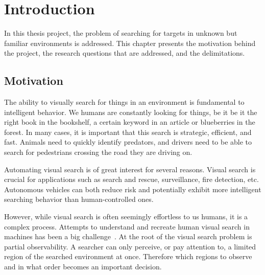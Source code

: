 
\chapter{Introduction}
\label{cha:introduction}


In this thesis project, the problem of searching for targets in unknown but familiar environments is addressed.
This chapter presents the motivation behind the project, the research questions that are addressed, and the delimitations. 

\section{Motivation}
\label{sec:motivation}


The ability to visually search for things in an environment is fundamental to intelligent behavior.
We humans are constantly looking for things, be it be it the right book in the bookshelf, a certain keyword in an article or blueberries in the forest.
In many cases, it is important that this search is strategic, efficient, and fast.
Animals need to quickly identify predators, and drivers need to be able to search for pedestrians crossing the road they are driving on.

Automating visual search is of great interest for several reasons.
Visual search is crucial for applications such as search and rescue, surveillance, fire detection, etc.
Autonomous vehicles can both reduce risk and potentially exhibit more intelligent searching behavior than human-controlled ones.

However, while visual search is often seemingly effortless to us humans, it is a complex process.
Attempts to understand and recreate human visual search in machines has been a big challenge~\cite{eckstein_visual_2011}.
At the root of the visual search problem is partial observability.
A searcher can only perceive, or pay attention to, a limited region of the searched environment at once.
Therefore which regions to observe and in what order becomes an important decision. 


